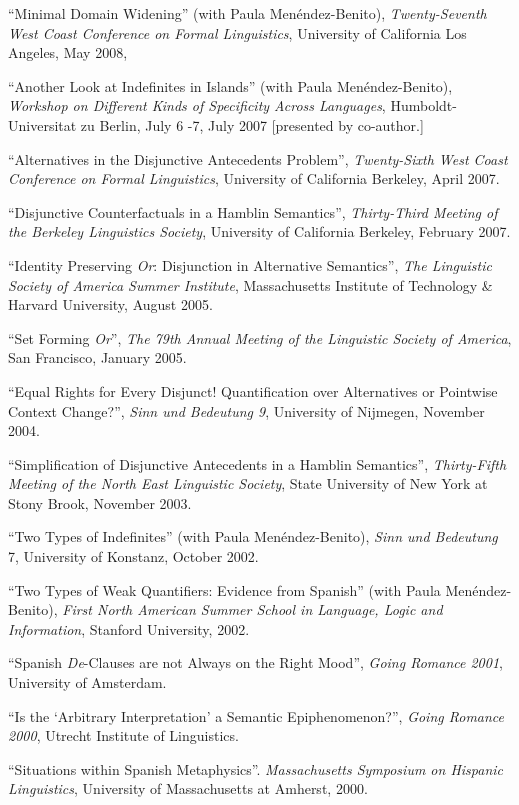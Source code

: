 \documentclass[11pt]{article}
\begin{document}
``Minimal Domain Widening'' (with Paula Men\'endez-Benito), \textit{Twenty-Seventh West Coast Conference on
  Formal Linguistics}, University of California Los Angeles, May 2008, 

``Another Look at Indefinites in Islands'' (with Paula
  Men\'endez-Benito), \textit{Workshop on Different Kinds of Specificity
  Across Languages}, Humboldt-Universitat zu Berlin, July 6
  -7, July 2007 [presented by co-author.]

``Alternatives in the Disjunctive Antecedents Problem'', \textit{Twenty-Sixth West Coast Conference on Formal Linguistics}, University of California Berkeley, April 2007.


``Disjunctive Counterfactuals in a Hamblin Semantics'', \textit{Thirty-Third Meeting of the Berkeley Linguistics Society}, University of California Berkeley, February 2007. 

``Identity Preserving \textit{Or}: Disjunction in Alternative Semantics'', \textit{The Linguistic Society of America Summer Institute}, Massachusetts Institute of Technology \& Harvard University, August 2005. 

``Set Forming \textit{Or}'', \textit{The 79th Annual Meeting of the Linguistic Society of America}, San Francisco, January 2005. 

``Equal Rights for Every Disjunct! Quantification over Alternatives or Pointwise Context Change?'', \textit{Sinn und Bedeutung 9}, University of Nijmegen, November 2004. 

``Simplification of Disjunctive Antecedents in a Hamblin Semantics'', \textit{Thirty-Fifth
  Meeting of the North East Linguistic Society}, State University of New York at Stony Brook, November 2003. 

``Two Types of Indefinites'' (with Paula Men\'endez-Benito), \textit{Sinn und Bedeutung} 7, University of Konstanz, October 2002. 

``Two Types of Weak Quantifiers: Evidence from Spanish'' (with Paula Men\'endez-Benito), \textit{First North American Summer School in Language, Logic and Information}, Stanford University, 2002. 

``Spanish \textit{De}-Clauses are not Always on the Right Mood'', \textit{Going Romance 2001}, University of Amsterdam. 

``Is the `Arbitrary Interpretation' a Semantic Epiphenomenon?'', \textit{Going Romance 2000}, Utrecht Institute of Linguistics.

``Situations within Spanish Metaphysics''. \textit{Massachusetts Symposium on Hispanic Linguistics}, University of Massachusetts at Amherst, 2000. 
\end{document}
